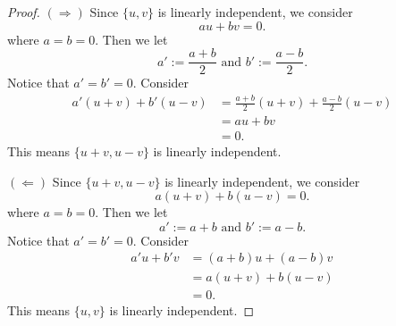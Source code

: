 \begin{Exercise}
\begin{proof}
$(\Longrightarrow)$
Since $\{u,v\}$ is linearly independent, we consider
$$
a u+b v = 0.
$$
where $a=b=0$. Then we let
$$
a' := \frac{a+b}{2}\text{ and } b' := \frac{a-b}{2}.
$$
Notice that $a'=b'=0$. Consider
\begin{align*}
a' (u+v)+b' (u-v)
&= \frac{a+b}{2}(u+v) + \frac{a-b}{2}(u-v) \\
&= a u+b v \\
&= 0.
\end{align*}
This means $\{u+v,u-v\}$ is linearly independent.

\vspace{2ex}

$(\Longleftarrow)$
Since $\{u+v,u-v\}$ is linearly independent, we consider
$$
a (u+v)+b (u-v) = 0.
$$
where $a=b=0$. Then we let
$$
a' := a+b\text{ and } b' := a-b.
$$
Notice that $a'=b'=0$. Consider
\begin{align*}
a' u + b' v
&= (a+b)u + (a-b)v \\
&= a(u+v)+b(u-v) \\
&= 0.
\end{align*}
This means $\{u,v\}$ is linearly independent.
\end{proof}
\end{Exercise}